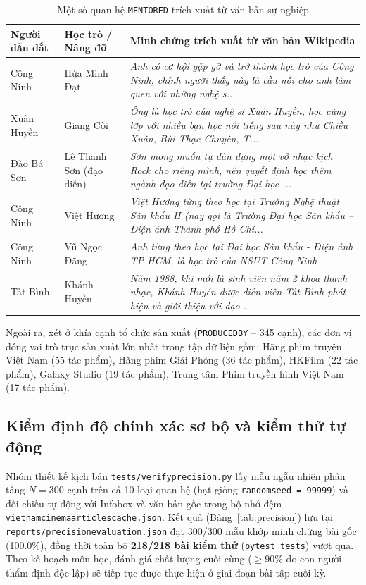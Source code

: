 \documentclass[12pt,a4paper]{article}
\renewcommand{\_}{\oldunderscore\hspace{0pt}}
\begin{document}
\begin{table}[htbp]
\centering
\small
\begin{tabularx}{\textwidth}{P{2.7cm} P{2.9cm} L}
\toprule
Người dẫn dắt & Học trò / Nâng đỡ & Minh chứng trích xuất từ văn bản Wikipedia \\
\midrule
Công Ninh & Hứa Minh Đạt & \textit{Anh có cơ hội gặp gỡ và trở thành học trò của Công Ninh, chính người thấy này là cầu nối cho anh làm quen với những nghệ s...} \\
Xuân Huyền & Giang Còi & \textit{Ông là học trò của nghệ sĩ Xuân Huyền, học cùng lớp với nhiều bạn học nổi tiếng sau này như Chiều Xuân, Bùi Thạc Chuyên, T...} \\
Đào Bá Sơn & Lê Thanh Sơn (đạo diễn) & \textit{Sơn mong muốn tự dàn dựng một vở nhạc kịch Rock cho riêng mình, nên quyết định học thêm ngành đạo diễn tại trường Đại học ...} \\
Công Ninh & Việt Hương & \textit{Việt Hương từng theo học tại Trường Nghệ thuật Sân khấu II (nay gọi là Trường Đại học Sân khấu – Điện ảnh Thành phố Hồ Chí...} \\
Công Ninh & Vũ Ngọc Đãng & \textit{Anh từng theo học tại Đại học Sân khấu - Điện ảnh TP HCM, là học trò của NSƯT Công Ninh} \\
Tất Bình & Khánh Huyền & \textit{Năm 1988, khi mới là sinh viên năm 2 khoa thanh nhạc, Khánh Huyền được diễn viên Tất Bình phát hiện và giới thiệu với đạo ...} \\
\bottomrule
\end{tabularx}
\caption{Một số quan hệ \texttt{MENTORED} trích xuất từ văn bản sự nghiệp}
\label{tab:mentored}
\end{table}

Ngoài ra, xét ở khía cạnh tổ chức sản xuất (\texttt{PRODUCED\_BY} -- 345 cạnh), các đơn vị đóng vai trò trục sản xuất lớn nhất trong tập dữ liệu gồm: Hãng phim truyện Việt Nam (55 tác phẩm), Hãng phim Giải Phóng (36 tác phẩm), HKFilm (22 tác phẩm), Galaxy Studio (19 tác phẩm), Trung tâm Phim truyền hình Việt Nam (17 tác phẩm).

\subsection{Kiểm định độ chính xác sơ bộ và kiểm thử tự động}

Nhóm thiết kế kịch bản \texttt{tests/\allowbreak verify\_precision.py} lấy mẫu ngẫu nhiên phân tầng $N = 300$ cạnh trên cả 10 loại quan hệ (hạt giống \texttt{random\_seed = 99999}) và đối chiếu tự động với Infobox và văn bản gốc trong bộ nhớ đệm \texttt{vietnam\_cinema\_articles\_cache.json}. Kết quả (Bảng~\ref{tab:precision}) lưu tại \texttt{reports/\allowbreak precision\_evaluation.json} đạt 300/300 mẫu khớp minh chứng bài gốc (100.0\%), đồng thời toàn bộ \textbf{218/218 bài kiểm thử} (\texttt{pytest tests}) vượt qua. Theo kế hoạch môn học, đánh giá chất lượng cuối cùng ($\ge 90\%$ do con người thẩm định độc lập) sẽ tiếp tục được thực hiện ở giai đoạn bài tập cuối kỳ.
\end{document}
